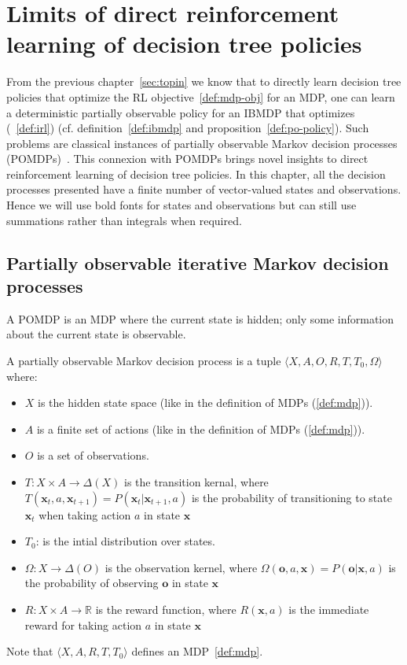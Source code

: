 \chapter{Limits of direct reinforcement learning of decision tree policies}\label{sec:pomdp}

From the previous chapter~\ref{sec:topin} we know that to directly learn decision tree policies that optimize the RL objective~\ref{def:mdp-obj} for an MDP, one can learn a deterministic partially observable policy for an IBMDP that optimizes (~\ref{def:irl}) (cf. definition~\ref{def:ibmdp} and proposition~\ref{def:po-policy}).
Such problems are classical instances of partially observable Markov decision processes (POMDPs)~\cite{POMDP,chap2}.
This connexion with POMDPs brings novel insights to direct reinforcement learning of decision tree policies. 
In this chapter, all the decision processes presented have a finite number of vector-valued states and observations.
Hence we will use bold fonts for states and observations but can still use summations rather than integrals when required.

\section{Partially observable iterative Markov decision processes}\label{sec:poibmdp}
A POMDP is an MDP where the current state is hidden; only some information about the current state is observable.

\begin{definition}\label{def:pomdp}
A partially observable Markov decision process is a tuple $\langle X, A, O, R, T, T_0, \Omega\rangle$ where:
\begin{itemize}
    \item $X$ is the hidden state space (like in the definition of MDPs (\ref{def:mdp})).
    \item $A$ is a finite set of actions (like in the definition of MDPs (\ref{def:mdp})).
    \item $O$ is a set of observations.
    \item $T: X \times A \rightarrow \Delta(X)$ is the transition kernal, where $T(\boldsymbol{x}_t, a, \boldsymbol{x}_{t+1}) = P(\boldsymbol{x}_t|\boldsymbol{x}_{t+1}, a)$ is the probability of transitioning to state $\boldsymbol{x}_{t}$ when taking action $a$ in state $\boldsymbol{x}$
    \item $T_0$: is the intial distribution over states. 
    \item $\Omega: X \rightarrow \Delta(O)$ is the observation kernel, where $\Omega(\boldsymbol{o}, a, \boldsymbol{x}) = P(\boldsymbol{o}|\boldsymbol{x}, a)$ is the probability of observing $\boldsymbol{o}$ in state $\boldsymbol{x}$
    \item $R: X \times A \rightarrow \mathbb{R}$ is the reward function, where $R(\boldsymbol{x}, a)$ is the immediate reward for taking action $a$ in state $\boldsymbol{x}$
\end{itemize}
Note that $\langle X, A, R, T, T_0 \rangle$ defines an MDP~\ref{def:mdp}.
\end{definition}

